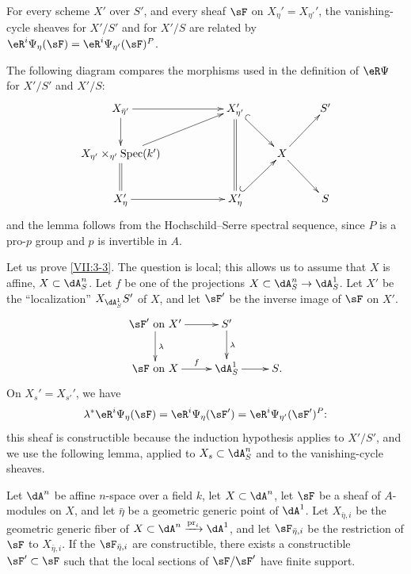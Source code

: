 \begin{lemma_}\label{VII:3-4}
For every scheme $X'$ over $S'$, and every sheaf $\sF$ on
$X_\eta'=X_{\eta'}'$, the vanishing-cycle sheaves for $X'/S'$ and for $X'/S$
are related by
$\eR^i \Psi_\eta(\sF) =\eR^i\Psi_{\eta'}(\sF)^P$.
\end{lemma_}

The following diagram compares the morphisms used in the definition of
$\eR\Psi$ for $X'/S'$ and $X'/S$:
\[\xymatrix{
  X_{\bar\eta'} \ar[rr] \ar[d] 
    & & X_{\eta'}' \ar@{=}[dd] \ar@{^{(}->}[dr] 
    & & S' \\ 
  X_{\eta'}\times_{\eta'}\spec(k') \ar@{=}[d] \ar[urr] 
    & & & X \ar[ur] \ar[dr] \\
  X_\eta' \ar[rr] 
    & & X_\eta' \ar@{^{(}->}[ur] 
    & & S
}\]
and the lemma follows from the Hochschild--Serre spectral sequence, since $P$
is a pro-$p$ group and $p$ is invertible in $A$.

Let us prove \ref{VII:3-3}. The question is local; this allows us to assume
that $X$ is affine, $X\subset \dA_S^n$. Let $f$ be one of the projections
$X\subset \dA_S^n\to \dA_S^1$. Let $X'$ be the ``localization''
$X_{\dA_S^1} S'$ of $X$, and let $\sF'$ be the inverse image of $\sF$ on $X'$.
\[\xymatrix{
  \sF'\text{ on }X' \ar[r] \ar[d]^-\lambda 
    & S' \ar[d]^-\lambda \\
  \sF \text{ on }X \ar[r]^-f 
    & \dA_S^1 \ar[r] 
    & S \text{.} 
}\]
On $X_s'=X_{s'}'$, we have
\[
  \lambda^\ast \eR^i\Psi_\eta(\sF) = \eR^i \Psi_\eta(\sF') = \eR^i\Psi_{\eta'}(\sF')^P \text{:} 
\]
this sheaf is constructible because the induction hypothesis applies to
$X'/S'$, and we use the following lemma, applied to
$X_s\subset \dA_S^n$ and to the vanishing-cycle sheaves.






\begin{lemma_}\label{VII:3-5}
Let $\dA^n$ be affine $n$-space over a field $k$, let $X\subset \dA^n$, let
$\sF$ be a sheaf of $A$-modules on $X$, and let $\bar\eta$ be a geometric
generic point of $\dA^1$. Let $X_{\bar\eta,i}$ be the geometric generic fiber
of $X\subset \dA^n\xrightarrow{\pr_i} \dA^1$, and let
$\sF_{\bar\eta,i}$ be the restriction of $\sF$ to $X_{\bar\eta,i}$. If the
$\sF_{\bar\eta,i}$ are constructible, there exists a constructible
$\sF'\subset \sF$ such that the local sections of $\sF/\sF'$ have finite
support.
\end{lemma_}

